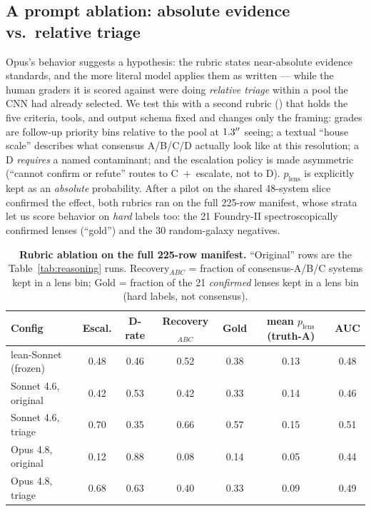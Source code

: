 \documentclass[11pt,letterpaper]{article}
\newcommand{\plens}{\ensuremath{p_{\mathrm{lens}}}}
\begin{document}
\subsection{A prompt ablation: absolute evidence vs.\ relative triage}
\label{sec:ablation}

Opus's behavior suggests a hypothesis: the rubric states near-absolute evidence
standards, and the more literal model applies them as written --- while the human
graders it is scored against were doing \emph{relative triage} within a pool the
CNN had already selected. We test this with a second rubric
() that holds the five criteria, tools,
and output schema fixed and changes only the framing: grades are follow-up
priority bins relative to the pool at $1.3^{\prime\prime}$ seeing; a textual ``house
scale'' describes what consensus A/B/C/D actually look like at this resolution; a
D \emph{requires} a named contaminant; and the escalation policy is made
asymmetric (``cannot confirm or refute'' routes to C~$+$~escalate, not to D).
\plens{} is explicitly kept as an \emph{absolute} probability. After a pilot on
the shared 48-system slice confirmed the effect, both rubrics ran on the full
225-row manifest, whose strata let us score behavior on \emph{hard} labels too:
the 21 Foundry-II spectroscopically confirmed lenses (``gold'') and the 30
random-galaxy negatives.

\begin{table}[ht]\centering
\caption{\textbf{Rubric ablation on the full 225-row manifest.} ``Original'' rows
are the Table~\ref{tab:reasoning} runs. Recovery$_{ABC}$ = fraction of
consensus-A/B/C systems kept in a lens bin; Gold = fraction of the 21
\emph{confirmed} lenses kept in a lens bin (hard labels, not consensus).}
\label{tab:ablation}
\small
\begin{tabular}{lcccccc}
\hline
Config & Escal. & D-rate & Recovery$_{ABC}$ & Gold & mean \plens{} (truth-A) & AUC \\
\hline
lean-Sonnet (frozen) & 0.48 & 0.46 & 0.52 & 0.38 & 0.13 & 0.48 \\
Sonnet 4.6, original & 0.42 & 0.53 & 0.42 & 0.33 & 0.14 & 0.46 \\
Sonnet 4.6, triage   & 0.70 & 0.35 & 0.66 & 0.57 & 0.15 & 0.51 \\
Opus 4.8, original   & 0.12 & 0.88 & 0.08 & 0.14 & 0.05 & 0.44 \\
Opus 4.8, triage     & 0.68 & 0.63 & 0.40 & 0.33 & 0.09 & 0.49 \\
\hline
\end{tabular}
\end{table}
\end{document}
